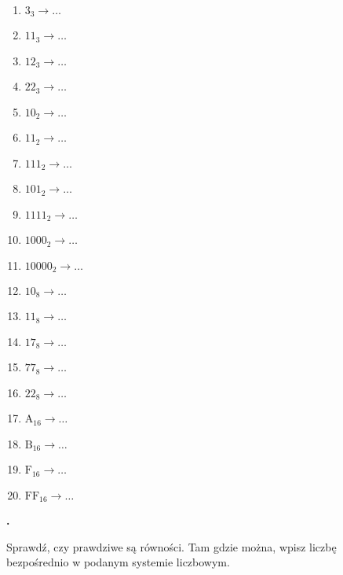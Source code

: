\documentclass[a4paper]{article}
\begin{document}
\begin{multicols}{2}
\begin{enumerate}[label=\arabic*.]
    \item $3_{3}\rightarrow \dots$
    \item $11_{3}\rightarrow \dots$
    \item $12_{3}\rightarrow \dots$
    \item $22_{3}\rightarrow \dots$

    \item $10_{2}\rightarrow \dots$
    \item $11_{2}\rightarrow \dots$
    \item $111_{2}\rightarrow \dots$
    \item $101_{2}\rightarrow \dots$
    \item $1111_{2}\rightarrow \dots$
    \item $1000_{2}\rightarrow \dots$
    \item $10000_{2}\rightarrow \dots$

    \item $10_{8}\rightarrow \dots$
    \item $11_{8}\rightarrow \dots$
    \item $17_{8}\rightarrow \dots$
    \item $77_{8}\rightarrow \dots$
    \item $22_{8}\rightarrow \dots$

    \item $\mathrm{A_{16}}\rightarrow \dots$
    \item $\mathrm{B_{16}}\rightarrow \dots$
    \item $\mathrm{F_{16}}\rightarrow \dots$
    \item $\mathrm{FF_{16}}\rightarrow \dots$

\end{enumerate}
\end{multicols}

\textbf{.}\addtocounter{zadanie}{1} Sprawdź, czy prawdziwe są równości. Tam gdzie można, wpisz liczbę bezpośrednio w podanym systemie liczbowym.
\end{document}
